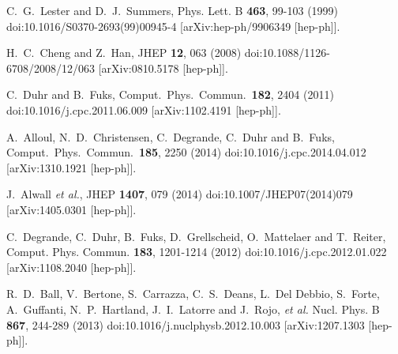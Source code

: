 \documentclass{ws-mpla}
\begin{document}
\begin{thebibliography}{99}
  C.~G.~Lester and D.~J.~Summers,
  Phys. Lett. B \textbf{463}, 99-103 (1999)
  doi:10.1016/S0370-2693(99)00945-4
  [arXiv:hep-ph/9906349 [hep-ph]].

  H.~C.~Cheng and Z.~Han,
  JHEP \textbf{12}, 063 (2008)
  doi:10.1088/1126-6708/2008/12/063
  [arXiv:0810.5178 [hep-ph]].

  C.~Duhr and B.~Fuks,
  Comput.\ Phys.\ Commun.\  {\bf 182}, 2404 (2011)
  doi:10.1016/j.cpc.2011.06.009
  [arXiv:1102.4191 [hep-ph]].
  
  A.~Alloul, N.~D.~Christensen, C.~Degrande, C.~Duhr and B.~Fuks,
  Comput.\ Phys.\ Commun.\  {\bf 185}, 2250 (2014)
  doi:10.1016/j.cpc.2014.04.012
  [arXiv:1310.1921 [hep-ph]].

  J.~Alwall {\it et al.},
  JHEP {\bf 1407}, 079 (2014)
  doi:10.1007/JHEP07(2014)079
  [arXiv:1405.0301 [hep-ph]].

  C.~Degrande, C.~Duhr, B.~Fuks, D.~Grellscheid, O.~Mattelaer and T.~Reiter,
  Comput. Phys. Commun. \textbf{183}, 1201-1214 (2012)
  doi:10.1016/j.cpc.2012.01.022
  [arXiv:1108.2040 [hep-ph]].

  R.~D.~Ball, V.~Bertone, S.~Carrazza, C.~S.~Deans, L.~Del Debbio, S.~Forte, A.~Guffanti, N.~P.~Hartland, J.~I.~Latorre and J.~Rojo, \textit{et al.}
  Nucl. Phys. B \textbf{867}, 244-289 (2013)
  doi:10.1016/j.nuclphysb.2012.10.003
  [arXiv:1207.1303 [hep-ph]].
  

\end{thebibliography}
\end{document}
